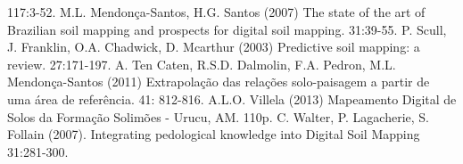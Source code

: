 \begin{footnotesize}
\begin{thebibliography}{99}
 117:3-52.
M.L. Mendonça-Santos, H.G. Santos (2007)
\newblock The state of the art of Brazilian soil mapping and prospects for digital soil mapping.
 31:39-55.
P. Scull, J. Franklin, O.A. Chadwick, D. Mcarthur (2003)
\newblock Predictive soil mapping: a review.
 27:171-197.
A. Ten Caten, R.S.D. Dalmolin, F.A. Pedron, M.L. Mendonça-Santos (2011)
\newblock Extrapolação das relações solo-paisagem a partir de uma área de referência.
 41: 812-816.
A.L.O. Villela (2013)
\newblock Mapeamento Digital de Solos da Formação Solimões - Urucu, AM.
 110p.
C. Walter, P. Lagacherie, S. Follain (2007).
\newblock Integrating pedological knowledge into Digital Soil Mapping
 31:281-300.
\end{thebibliography}
\end{footnotesize}
\address{Marcos Bacis Ceddia\\
  Universidade Federal Rural do Rio de Janeiro\\
  \url{www.aguaesolos.net}\\
  }